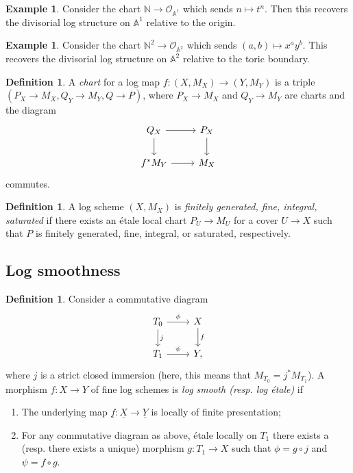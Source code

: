 \documentclass{amsart}
\theoremstyle{definition}
\newtheorem{defn}[thm]{Definition}
\newtheorem{exm}[thm]{Example}
\theoremstyle{remark}
\theoremstyle{plain}
\theoremstyle{definition}
\theoremstyle{remark}
\newcommand{\A}{\mathbb{A}}
\newcommand{\N}{\mathbb{N}}
\newcommand{\mc}[1]{\mathcal{#1}}
\newcommand{\ul}[1]{\underline{#1}}
\newcommand{\1}{\mathbf{1}}
\newcommand{\2}{\mathbf{2}}
\newcommand{\3}{\mathbf{3}}
\begin{document}
\begin{exm}
    Consider the chart \(\N \to \mc{O}_{\A^1}\) which sends \(n \mapsto t^n\). Then this recovers the divisorial log structure on \(\A^1\) relative to the origin.
\end{exm}

\begin{exm}
    Consider the chart \(\N^2 \to \mc{O}_{\A^2}\) which sends \((a,b) \mapsto x^a y^b\). This recovers the divisorial log structure on \(\A^2\) relative to the toric boundary.   
\end{exm}

\begin{defn}
    A \textit{chart} for a log map \(f \colon (X, M_X) \to (Y, M_Y)\) is a triple \((P_X\to M_X, Q_Y \to M_Y, Q \to P)\), where \(P_X \to M_X\) and \(Q_Y \to M_Y\) are charts and the diagram
    \begin{equation*}
    \begin{tikzcd}
        Q_X \ar{r} \ar{d} & P_X \ar{d} \\
        f^* M_Y \ar{r} & M_X
    \end{tikzcd}
    \end{equation*}
    commutes.
\end{defn}

\begin{defn}
    A log scheme \((X, M_X)\) is \textit{finitely generated, fine, integral, saturated} if there exists an \'etale local chart \(P_U \to M_U\) for a cover \(U \to X\) such that \(P\) is finitely generated, fine, integral, or saturated, respectively.
\end{defn}

\subsection{Log smoothness}%
\label{sub:Log smoothness}

\begin{defn}
    Consider a commutative diagram
    \begin{equation*}
    \begin{tikzcd}
        T_0 \ar{r}{\phi} \ar{d}{j} & X \ar{d}{f} \\
        T_1 \ar{r}{\psi} & Y,
    \end{tikzcd}
    \end{equation*}
    where \(j\) is a strict closed immersion (here, this means that \(M_{T_0} = j^* M_{T_1}\)). A morphism \(f \colon X \to Y\) of fine log schemes is \textit{log smooth (resp. log \'etale)} if
    \begin{enumerate}
        \item The underlying map \(\ul{f} \colon \ul{X} \to \ul{Y}\) is locally of finite presentation;
        \item For any commutative diagram as above, \'etale locally on \(T_1\) there exists a (resp. there exists a unique) morphism \(g \colon T_1 \to X\) such that \(\phi = g \circ j\) and \(\psi = f \circ g\).
    \end{enumerate}
\end{defn}
\end{document}
